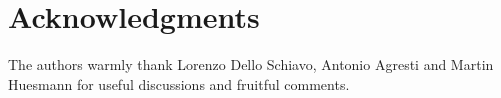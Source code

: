 \documentclass[11pt,a4paper,oneside]{amsart}
\numberwithin{equation}{section}
\newcommand{\LL}{\mathrm{L}}
\begin{document}
%


\section*{Acknowledgments} The authors warmly thank Lorenzo Dello Schiavo, Antonio Agresti and Martin Huesmann for useful discussions and fruitful comments.



\end{document}
